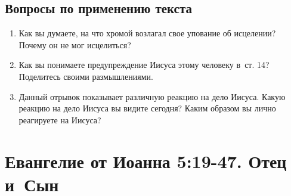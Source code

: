 \documentclass[a4paper,12pt]{article}
\begin{document}
\subsection*{Вопросы по применению текста} 
\begin{enumerate}
    \item Как вы думаете, на что хромой возлагал свое упование об исцелении? Почему он не мог исцелиться?
    
    \myline
    
    \myline
    \item Как вы понимаете предупреждение Иисуса этому человеку в~ст. 14? Поделитесь своими размышлениями.
    
    \myline
    
    \myline
    \item Данный отрывок показывает различную реакцию на дело Иисуса. Какую реакцию на дело Иисуса вы видите сегодня? Каким образом вы лично реагируете на Иисуса?
    
    \myline
    
    \myline
\end{enumerate}



\section{Евангелие от Иоанна 5:19-47. Отец и~Сын}
\end{document}
